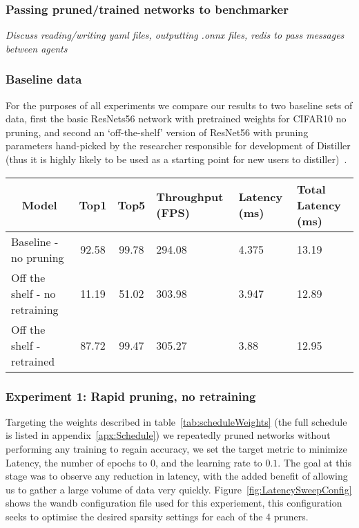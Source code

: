 \documentclass[../Dissertation.tex]{subfiles}
\begin{document}
\doublespacing

\subsubsection{Passing pruned/trained networks to benchmarker}
\emph{Discuss reading/writing yaml files, outputting .onnx files, redis to pass messages between agents}

\subsubsection{Baseline data}
For the purposes of all experiments we compare our results to two baseline sets of data, first the basic ResNets56 network with pretrained weights for CIFAR10 no pruning, and second an `off-the-shelf' version of ResNet56 with pruning parameters hand-picked by the researcher responsible for development of Distiller (thus it is highly likely to be used as a starting point for new users to distiller)~\autocite{liPruningFiltersEfficient2017}.

\begin{table}[H]
    \begin{tabular}{@{}lccp{25mm}p{23mm}p{28mm}@{}}
    \toprule
    \multicolumn{1}{c}{\textbf{Model}} & \textbf{Top1} & \textbf{Top5} & \textbf{Throughput (FPS)} & \textbf{Latency (ms)} & \textbf{Total Latency (ms)} \\ \midrule
    Baseline - no pruning              & 92.58         & 99.78         & 294.08                    & 4.375                 & 13.19                       \\
    Off the shelf - no retraining      & 11.19         & 51.02         & 303.98                    & 3.947                 & 12.89                       \\
    Off the shelf - retrained          &  87.72        & 99.47         & 305.27                    & 3.88                  & 12.95                           \\ \bottomrule
    \end{tabular}
\end{table}

\subsubsection{Experiment 1: Rapid pruning, no retraining}
Targeting the weights described in table~\ref{tab:scheduleWeights} (the full schedule is listed in appendix~\ref{apx:Schedule}) we repeatedly pruned networks without performing any training to regain accuracy, we set the target metric to minimize Latency, the number of epochs to $0$, and the learning rate to $0.1$.
The goal at this stage was to observe any reduction in latency, with the added benefit of allowing us to gather a large volume of data very quickly.
Figure~\ref{fig:LatencySweepConfig} shows the wandb configuration file used for this experiement, this configuration seeks to optimise the desired sparsity settings for each of the 4 pruners.
\end{document}
